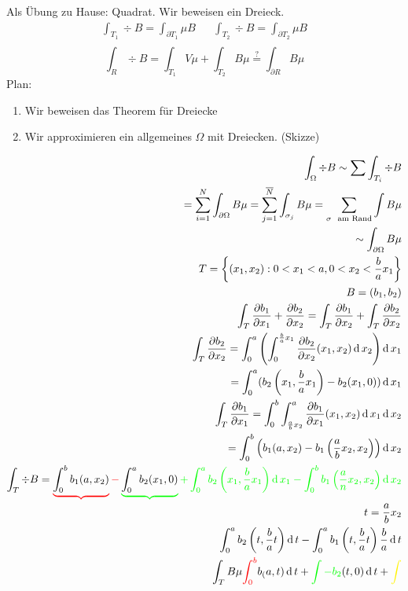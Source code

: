 \begin{Bew}
  Als Übung zu Hause: Quadrat. Wir beweisen ein Dreieck.
  \begin{align*}
    \int_{T_1}\div B=\int_{\partial T_1}\mu B && \int_{T_2}\div B=\int_{\partial T_2}\mu B\\
  \end{align*}
  \[\int_R\div B=\int_{T_1}V\mu +\int_{T_2}B\mu \stackrel{?}{=}\int_{\partial R}B\mu\]
  Plan:
  \begin{enumerate}
    \item Wir beweisen das Theorem für Dreiecke
    \item Wir approximieren ein allgemeines $\Omega$ mit Dreiecken. (Skizze)
  \end{enumerate}
  \begin{eqnarray*}
    \int_\Omega\div B\sim\sum\int_{T_i}\div B\\
    =\sum_{i=1}^N\int_{\partial\Omega}B\mu=\sum_{j=1}^{\ol{N}}\int_{\sigma_j}B\mu=\sum_{\sigma\s\text{am Rand}}\int B\mu\\
    \sim\int_{\partial\Omega}B\mu\\
    T=\left\{ (x_1,x_2):0<x_1<a, 0<x_2<\frac{b}{a}x_1 \right\}\\
    B=(b_1,b_2)\\
    \int_T\Part{b_1}{x_1}+\Part{b_2}{x_2}=\int_T\Part{b_1}{x_2}+\int_T\Part{b_2}{x_2}\\
    \int_T\Part{b_2}{x_2}=\int_0^a\left( \int_0^{\frac{b}{a}x_1}\Part{b_2}{x_2}(x_1,x_2)\md x_2 \right)\md x_1\\
    =\int_0^a(b_2\left( x_1,\frac{b}{a}x_1 \right)-b_2(x_1,0))\md x_1\\
    \int_T\Part{b_1}{x_1}=\int_0^b\int^a_{\frac{a}{b}x_2}\Part{b_1}{x_1}(x_1,x_2)\md x_1\md x_2\\
    =\int_0^b\left( b_1(a,x_2)-b_1\left( \frac{a}{b}x_2,x_2 \right) \right)\md x_2\\
    \int_T\div B=\color{red}\underbrace{\color{black}\int_0^bb_1(a,x_2)}-\color{green}\underbrace{\color{black}\int_0^ab_2(x_1,0)}+\int_0^ab_2\left( x_1,\frac{b}{a}x_1 \right)\md x_1-\int_0^bb_1\left( \frac{a}{n}x_2,x_2 \right)\md x_2\\
    t=\frac{a}{b}x_2\\
    \int_0^ab_2\left( t,\frac{b}{a}t \right)\md t-\int_0^ab_1\left( t,\frac{b}{a}t \right)\frac{b}{a}\md t\\
    \int_T B\mu{\color{red}\int_0^b}b_(a,t)\md t + {\color{green}\int -b_2}(t,0)\md t + {\color{yellow}\int}\\

\end{eqnarray*}
\end{Bew}
